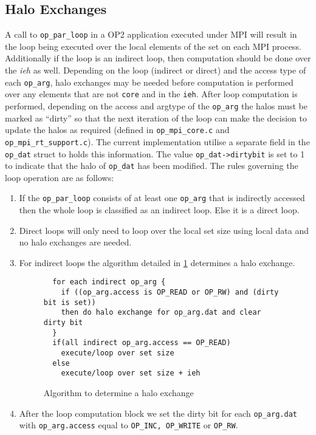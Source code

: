 \documentclass[11pt]{article}
\begin{document}
\subsection{Halo Exchanges}\label{subsec/exchange}
A call to \texttt{op\_par\_loop} in a OP2 application executed under MPI will result in the loop being executed over the
local elements of the set on each MPI process. Additionally if the loop is an indirect loop, then computation
should be done over the \textit{ieh} as well. Depending on the loop (indirect or direct) and the access type of each
\texttt{op\_arg}, halo exchanges may be needed before computation is performed over any elements that are not
\texttt{core} and in the \texttt{ieh}. After loop computation is performed, depending on the access and argtype of the
\texttt{op\_arg} the halos must be marked as ``dirty'' so that the next iteration of the loop can make the decision to
update the halos as required (defined in \texttt{op\_mpi\_core.c} and \texttt{op\_mpi\_rt\_support.c}). The current
implementation utilise a separate field in the \texttt{op\_dat} struct to holds this information. The value
\texttt{op\_dat->dirtybit} is set to 1 to indicate that the halo of \texttt{op\_dat} has been modified. The rules
governing the loop operation are as follows:
\begin{enumerate}
\item If the \texttt{op\_par\_loop} consists of at least one \texttt{op\_arg}
that is indirectly accessed then the whole loop is classified as an indirect
loop. Else it is a direct loop.

\item Direct loops will only need to loop over the local set size using local
data and no halo exchanges are needed.

\item For indirect loops the algorithm detailed in \figurename{ \ref{fig:haloexchange}} determines a halo exchange.

\begin{figure}[t]\small
\begin{verbatim}
  for each indirect op_arg {
    if ((op_arg.access is OP_READ or OP_RW) and (dirty bit is set))
    then do halo exchange for op_arg.dat and clear dirty bit
  }
  if(all indirect op_arg.access == OP_READ)
    execute/loop over set size
  else
    execute/loop over set size + ieh
\end{verbatim}
\caption{\small Algorithm to determine a halo exchange}
\normalsize\vspace{-0pt}\label{fig:haloexchange}
\end{figure}

\item After the loop computation block we set the dirty bit for each
\texttt{op\_arg.dat} with \texttt{op\_arg.access} equal to \texttt{OP\_INC,
OP\_WRITE} or \texttt{OP\_RW}.
\end{enumerate}
\end{document}
